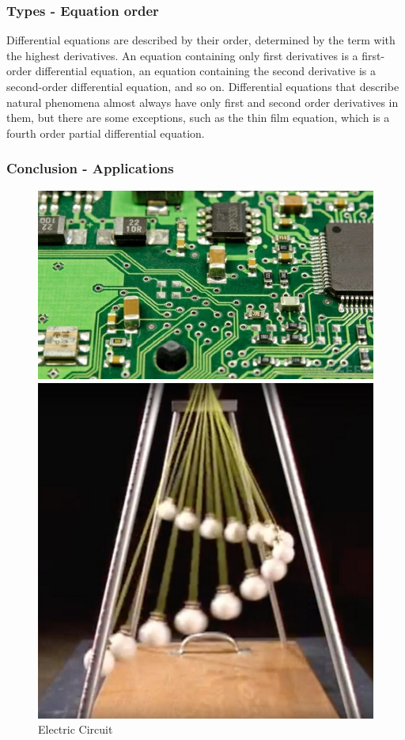 \documentclass{beamer}
\begin{document}
  \begin{frame}
  \frametitle {Types - Equation order}
  Differential equations are described by their order, determined by the term with the highest derivatives. 
  An equation containing only first derivatives is a first-order differential equation, an equation containing the second derivative is a second-order differential equation, and so on. 
  Differential equations that describe natural phenomena almost always have only first and second order derivatives in them, but there are some exceptions, 
  such as the thin film equation, which is a fourth order partial differential equation.
  \end{frame}

\begin{frame}[allowframebreaks]
  \frametitle {Conclusion - Applications}
  \begin{figure}
    \begin{minipage}{.45\textwidth}
      \includegraphics[width=\linewidth]{electricCircuit} 
      \caption{Electric Circuit}
    \end{minipage}\hfill
    \begin{minipage}{.45\textwidth}
      \includegraphics[width=\linewidth]{pendulummovement}

\end{minipage}
\end{figure}
\end{frame}
\end{document}
